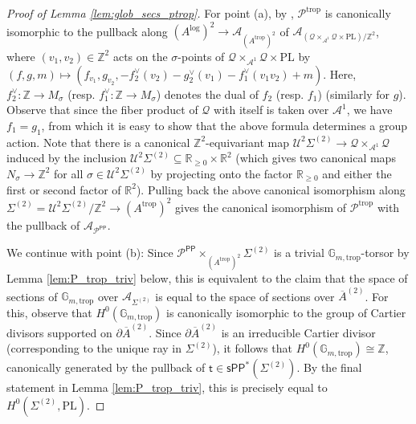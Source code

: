 \documentclass[11pt]{article}
\def\PL{\mathrm{PL}}
\newcommand{\trop}{\mathrm{trop}}
\renewcommand{\log}{\mathrm{log}}
\newcommand{\barA}{\overline{A}}
\newcommand{\sfpp}{\mathsf{PP}}
\newcommand{\logA}{{A^{\log}}}
\newcommand{\tropA}{{A^{\trop}}}
\newcommand{\sPP}{\mathsf{sPP}}
\newcommand{\spp}{\sPP}
\theoremstyle{definition}
\begin{document}
\begin{proof}[Proof of Lemma \ref{lem:glob_secs_ptrop}]
	For point (a), by \cite[Proposition 1.6 and Lemma 3.10]{KKN5}, $\mathcal{P}^{\trop}$
	is canonically isomorphic to the pullback along $(\logA)^{2}\to \mathcal{A}_{(\tropA)^{2}}$
	of $\mathcal{A}_{(\mathcal{Q}\times_{\mathcal{A}^{1}}\mathcal{Q}\times \PL)/\mathbb{Z}^{2}}$,
	where $(v_1,v_2)\in \mathbb{Z}^{2}$ acts on the $\sigma$-points of $\mathcal{Q}\times_{\mathcal{A}^{1}}\mathcal{Q}\times \PL$
	by $(f,g,m)\mapsto (f_{v_1},g_{v_2},-f_2^{\vee}(v_2)-g_2^{\vee}(v_1)-f_1^{\vee}(v_1v_2)+m)$.
	Here, $f_2^{\vee}:\mathbb{Z}\to M_{\sigma}$ (resp. $f_1^{\vee}:\mathbb{Z}\to M_{\sigma}$) denotes the dual of $f_2$
	(resp. $f_1$) (similarly for $g$). Observe that since the fiber product of $\mathcal{Q}$
	with itself is taken over $\mathcal{A}^{1}$, we have
	$f_1=g_1$, from which it is easy to show that the above formula
	determines a group action. Note that there is a canonical $\mathbb{Z}^{2}$-equivariant map
	$\mathcal U^2\Sigma^{(2)}\to \mathcal{Q}\times_{\mathcal{A}^{1}}\mathcal{Q}$
	induced by the inclusion $\mathcal U^2\Sigma^{(2)}\subseteq \mathbb{R}_{\ge 0}\times \mathbb{R}^{2}$
	(which gives two canonical maps $N_{\sigma}\to \mathbb{Z}^{2}$ for all $\sigma\in \mathcal U^2\Sigma^{(2)}$ by projecting onto the factor $\mathbb{R}_{\ge 0}$ and either the first or second factor of $\mathbb{R}^{2}$).
	Pulling back the above canonical isomorphism along $\Sigma^{(2)}=\mathcal U^2\Sigma^{(2)}/\mathbb{Z}^{2}\to (\tropA)^{2}$
	gives the canonical isomorphism of $\mathcal{P}^{\trop}$ with the pullback of $\mathcal{A}_{\mathcal{P}^{\sfpp}}$.

	We continue with point (b): Since $\mathcal{P}^{\sfpp}\times_{(\tropA)^{2}}\Sigma^{(2)}$
	is a trivial $\mathbb{G}_{m,\trop}$-torsor by Lemma \ref{lem:P_trop_triv} below, this is equivalent
	to the claim that the space of sections of $\mathbb{G}_{m,\trop}$
	over $\mathcal{A}_{\Sigma^{(2)}}$ is equal to the space of sections over $\barA^{(2)}$.
	For this, observe that $H^{0}(\mathbb{G}_{m,\trop})$ is canonically isomorphic to the group of
	Cartier divisors supported on $\partial\barA^{(2)}$. Since $\partial\barA^{(2)}$ is an irreducible Cartier divisor
	(corresponding to the unique ray in $\Sigma^{(2)}$), it follows that $H^{0}(\mathbb{G}_{m,\trop})\cong \mathbb{Z}$,
	canonically generated by the pullback of $\mathsf{t}\in \spp^{\ast}(\Sigma^{(2)})$. By the final statement in Lemma \ref{lem:P_trop_triv},
	this is precisely equal to $H^{0}(\Sigma^{(2)},\PL)$.
\end{proof}
\end{document}
